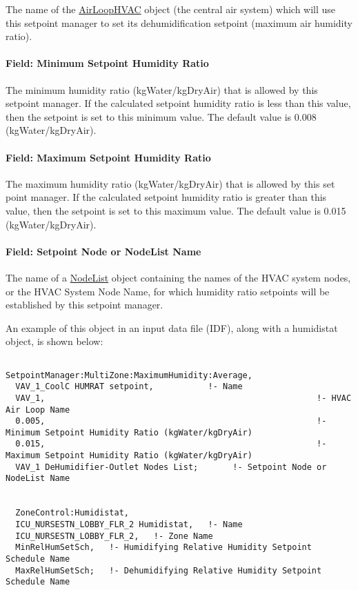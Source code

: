 The name of the \hyperref[airloophvac]{AirLoopHVAC} object (the central air system) which will use this setpoint manager to set its dehumidification setpoint (maximum air humidity ratio).

\paragraph{Field: Minimum Setpoint Humidity Ratio}\label{field-minimum-setpoint-humidity-ratio-2}

The minimum humidity ratio (kgWater/kgDryAir) that is allowed by this setpoint manager. If the calculated setpoint humidity ratio is less than this value, then the setpoint is set to this minimum value. The default value is 0.008 (kgWater/kgDryAir).

\paragraph{Field: Maximum Setpoint Humidity Ratio}\label{field-maximum-setpoint-humidity-ratio-2}

The maximum humidity ratio (kgWater/kgDryAir) that is allowed by this set point manager. If the calculated setpoint humidity ratio is greater than this value, then the setpoint is set to this maximum value. The default value is 0.015 (kgWater/kgDryAir).

\paragraph{Field: Setpoint Node or NodeList Name}\label{field-setpoint-node-or-nodelist-name-16}

The name of a \hyperref[nodelist]{NodeList} object containing the names of the HVAC system nodes, or the HVAC System Node Name, for which humidity ratio setpoints will be established by this setpoint manager.

An example of this object in an input data file (IDF), along with a humidistat object, is shown below:

\begin{lstlisting}

SetpointManager:MultiZone:MaximumHumidity:Average,
  VAV_1_CoolC HUMRAT setpoint,           !- Name
  VAV_1,                                                       !- HVAC Air Loop Name
  0.005,                                                       !- Minimum Setpoint Humidity Ratio (kgWater/kgDryAir)
  0.015,                                                       !- Maximum Setpoint Humidity Ratio (kgWater/kgDryAir)
  VAV_1 DeHumidifier-Outlet Nodes List;       !- Setpoint Node or NodeList Name


  ZoneControl:Humidistat,
  ICU_NURSESTN_LOBBY_FLR_2 Humidistat,   !- Name
  ICU_NURSESTN_LOBBY_FLR_2,   !- Zone Name
  MinRelHumSetSch,   !- Humidifying Relative Humidity Setpoint Schedule Name
  MaxRelHumSetSch;   !- Dehumidifying Relative Humidity Setpoint Schedule Name
\end{lstlisting}

